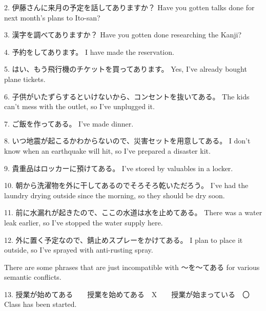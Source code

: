 \par{2. 伊藤さんに来月の予定を話してありますか？ \hfill\break
Have you gotten talks done for next month's plans to Ito-san? }

\par{3. 漢字を調べてありますか？ \hfill\break
Have you gotten done researching the Kanji? }

\par{4. 予約をしてあります。 \hfill\break
I have made the reservation. }

\par{5. はい、もう飛行機のチケットを買ってあります。 \hfill\break
Yes, I've already bought plane tickets. }

\par{6. 子供がいたずらするといけないから、コンセントを抜いてある。 \hfill\break
The kids can't mess with the outlet, so I've unplugged it. }

\par{7. ご飯を作ってある。 \hfill\break
I've made dinner. }

\par{8. いつ地震が起こるかわからないので、災害セットを用意してある。 \hfill\break
I don't know when an earthquake will hit, so I've prepared a disaster kit. }

\par{9. 貴重品はロッカーに預けてある。 \hfill\break
I've stored by valuables in a locker. }

\par{10. 朝から洗濯物を外に干してあるのでそろそろ乾いただろう。 \hfill\break
I've had the laundry drying outside since the morning, so they should be dry soon. }

\par{11. 前に水漏れが起きたので、ここの水道は水を止めてある。 \hfill\break
There was a water leak earlier, so I've stopped the water supply here. }

\par{12. 外に置く予定なので、錆止めスプレーをかけてある。  \hfill\break
I plan to place it outside, so I've sprayed with anti-rusting spray. }

\par{ There are some phrases that are just incompatible with ～を～てある for various semantic conflicts. }

\par{13. 授業が始めてある　\textrightarrow 　授業を始めてある　X　\textrightarrow 　授業が始まっている　〇 \hfill\break
Class has been started. }

